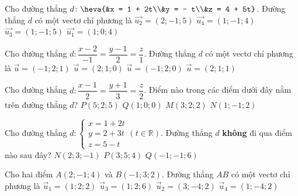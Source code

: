 \begin{ex}
	Cho đường thẳng $d\colon \heva{&x = 1 + 2t\\&y = - t\\&z = 4 + 5t}$. Đường thẳng $d$ có một vectơ chỉ phương là
	\choice
	{\True $\overrightarrow{u_2} = \left(2;-1;5\right)$}
	{$\overrightarrow{u_4} = \left(1;-1;4\right)$}
	{$\overrightarrow{u_3} = \left(1;-1;5\right)$}
	{$\overrightarrow{u_1} = \left(1;0;4\right)$}
\end{ex}

\begin{ex}
	Cho đường thẳng $d\colon \dfrac{x-2}{-1}=\dfrac{y-1}{2}=\dfrac{z}{1}$. Đường thẳng $d$ có một vectơ chỉ phương là
	\choice
	{\True $\vec{u}=(-1;2;1)$}
	{ $\vec{u}=(2;1;0)$}
	{ $\vec{u}=(-1;2;0)$}
	{ $\vec{u}=(2;1;1)$}
\end{ex}

\begin{ex}
	Cho đường thẳng $d: \dfrac{x-1}{2}=\dfrac{y+1}{3}=\dfrac{z}{2}$. Điểm nào trong các điểm dưới đây nằm trên đường thẳng $d$?
	\choice
	{$P(5;2;5)$}
	{$Q(1;0;0)$}
	{\True $M(3;2;2)$}
	{$N(1;-1;2)$}
	\loigiai{
	}
\end{ex}

\begin{ex}
	Cho đường thẳng $d: \begin{cases}
		x=1+2t \\
		y=2+3t \\
		z=5-t
	\end{cases}(t\in \mathbb{R})$. Đường thẳng $d$ \textbf{không} đi qua điểm nào sau đây?
	{\True $N(2;3;-1)$}
	{$P(3;5;4)$}
	{$Q(-1;-1;6)$} 
	\loigiai{
	}
\end{ex}

\begin{ex}%
	Cho hai điểm $A(2;-1;4)$ và $B(-1;3;2)$. Đường thẳng $AB$ có một vectơ chỉ phương là
	\choice
	{$\overrightarrow{u}_1=(1;2;2)$}
	{$\overrightarrow{u}_3=(1;2;6)$}
	{\True $\overrightarrow{u}_2=(3;-4;2)$}
	{$\overrightarrow{u}_4=(1;-4;2)$}
\end{ex}

